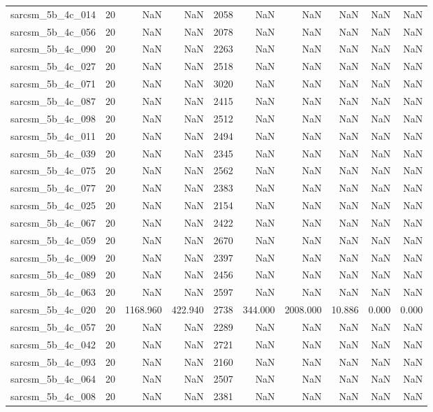 \begin{tabular}{lrrrrrrrrr}
sarcsm\_5b\_4c\_014 & 20 & NaN & NaN & 2058 & NaN & NaN & NaN & NaN & NaN \\
sarcsm\_5b\_4c\_056 & 20 & NaN & NaN & 2078 & NaN & NaN & NaN & NaN & NaN \\
sarcsm\_5b\_4c\_090 & 20 & NaN & NaN & 2263 & NaN & NaN & NaN & NaN & NaN \\
sarcsm\_5b\_4c\_027 & 20 & NaN & NaN & 2518 & NaN & NaN & NaN & NaN & NaN \\
sarcsm\_5b\_4c\_071 & 20 & NaN & NaN & 3020 & NaN & NaN & NaN & NaN & NaN \\
sarcsm\_5b\_4c\_087 & 20 & NaN & NaN & 2415 & NaN & NaN & NaN & NaN & NaN \\
sarcsm\_5b\_4c\_098 & 20 & NaN & NaN & 2512 & NaN & NaN & NaN & NaN & NaN \\
sarcsm\_5b\_4c\_011 & 20 & NaN & NaN & 2494 & NaN & NaN & NaN & NaN & NaN \\
sarcsm\_5b\_4c\_039 & 20 & NaN & NaN & 2345 & NaN & NaN & NaN & NaN & NaN \\
sarcsm\_5b\_4c\_075 & 20 & NaN & NaN & 2562 & NaN & NaN & NaN & NaN & NaN \\
sarcsm\_5b\_4c\_077 & 20 & NaN & NaN & 2383 & NaN & NaN & NaN & NaN & NaN \\
sarcsm\_5b\_4c\_025 & 20 & NaN & NaN & 2154 & NaN & NaN & NaN & NaN & NaN \\
sarcsm\_5b\_4c\_067 & 20 & NaN & NaN & 2422 & NaN & NaN & NaN & NaN & NaN \\
sarcsm\_5b\_4c\_059 & 20 & NaN & NaN & 2670 & NaN & NaN & NaN & NaN & NaN \\
sarcsm\_5b\_4c\_009 & 20 & NaN & NaN & 2397 & NaN & NaN & NaN & NaN & NaN \\
sarcsm\_5b\_4c\_089 & 20 & NaN & NaN & 2456 & NaN & NaN & NaN & NaN & NaN \\
sarcsm\_5b\_4c\_063 & 20 & NaN & NaN & 2597 & NaN & NaN & NaN & NaN & NaN \\
sarcsm\_5b\_4c\_020 & 20 & 1168.960 & 422.940 & 2738 & 344.000 & 2008.000 & 10.886 & 0.000 & 0.000 \\
sarcsm\_5b\_4c\_057 & 20 & NaN & NaN & 2289 & NaN & NaN & NaN & NaN & NaN \\
sarcsm\_5b\_4c\_042 & 20 & NaN & NaN & 2721 & NaN & NaN & NaN & NaN & NaN \\
sarcsm\_5b\_4c\_093 & 20 & NaN & NaN & 2160 & NaN & NaN & NaN & NaN & NaN \\
sarcsm\_5b\_4c\_064 & 20 & NaN & NaN & 2507 & NaN & NaN & NaN & NaN & NaN \\
sarcsm\_5b\_4c\_008 & 20 & NaN & NaN & 2381 & NaN & NaN & NaN & NaN & NaN \\

\end{tabular}
